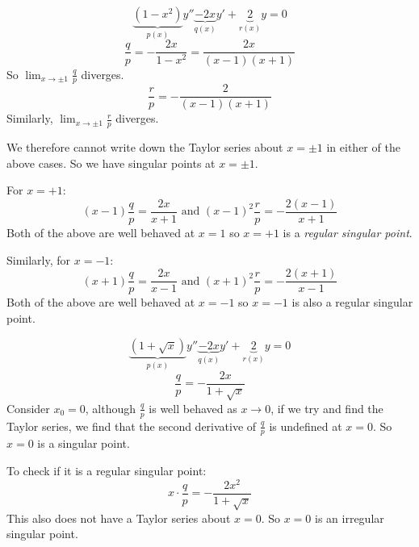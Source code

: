 \documentclass[../main.tex]{subfiles}
\begin{document}
\begin{example}
  \label{pointClassificationEx}
  \[
    \underbrace{(1 - x^2)}_{p(x)}y'' \underbrace{- 2x}_{q(x)}y' + \underbrace{2}_{r(x)}y = 0
  \]
  \[
    \frac{q}{p} = -\frac{2x}{1-x^2} = \frac{2x}{(x - 1)(x + 1)}
  \]
  So $\lim_{x \to \pm 1} \frac{q}{p}$ diverges.
  \[
    \frac{r}{p} = -\frac{2}{(x - 1)(x + 1)}
  \]
  Similarly, $\lim_{x \to \pm 1} \frac{r}{p}$ diverges.

  We therefore cannot write down the Taylor series about $x = \pm 1$ in either of the above cases.
  So we have singular points at $x = \pm 1$.

  For $x = + 1$:
  \[
    (x - 1)\frac{q}{p} = \frac{2x}{x + 1}\text{ and }
    (x - 1)^2\frac{r}{p} = -\frac{2(x - 1)}{x + 1}
  \]
  Both of the above are well behaved at $x = 1$ so $x = +1$ is a \textit{regular singular point}.

  Similarly, for $x = -1$:
  \[
    (x + 1)\frac{q}{p} = \frac{2x}{x - 1}\text{ and }
    (x + 1)^2\frac{r}{p} = -\frac{2(x + 1)}{x - 1}
  \]
  Both of the above are well behaved at $x = -1$ so $x = -1$ is also a regular singular point.
\end{example}
\begin{example}
  \[
    \underbrace{(1 + \sqrt{x})}_{p(x)}y'' \underbrace{- 2x}_{q(x)}y' + \underbrace{2}_{r(x)}y = 0
  \]
  \[
    \frac{q}{p} = -\frac{2x}{1 + \sqrt{x}}
  \]
  Consider $x_0 = 0$, although $\frac{q}{p}$ is well behaved as $x \to 0$, if we try and find the Taylor series, we find that the second derivative of $\frac{q}{p}$ is undefined at $x = 0$.
  So $x = 0$ is a singular point.

  To check if it is a regular singular point:
  \[
    x \cdot \frac{q}{p} = -\frac{2x^2}{1 + \sqrt{x}}
  \]
  This also does not have a Taylor series about $x = 0$.
  So $x = 0$ is an irregular singular point.
\end{example}
\end{document}
